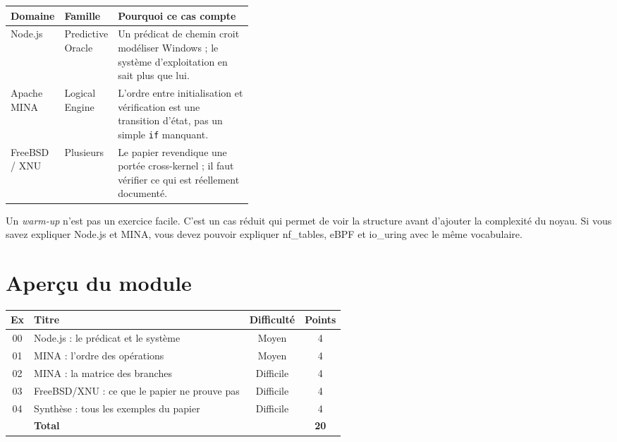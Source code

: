 \documentclass{training}
\begin{document}
\begin{center}
\begin{tabularx}{\linewidth}{|p{0.2\linewidth}|p{0.2\linewidth}|X|}
\hline
\textbf{Domaine} & \textbf{Famille} & \textbf{Pourquoi ce cas compte} \\ \hline
Node.js & Predictive Oracle & Un prédicat de chemin croit modéliser Windows ;
le système d'exploitation en sait plus que lui. \\ \hline
Apache MINA & Logical Engine & L'ordre entre initialisation et vérification
est une transition d'état, pas un simple \texttt{if} manquant. \\ \hline
FreeBSD / XNU & Plusieurs & Le papier revendique une portée cross-kernel ;
il faut vérifier ce qui est réellement documenté. \\ \hline
\end{tabularx}
\end{center}

\begin{info}
Un \emph{warm-up} n'est pas un exercice facile. C'est un cas réduit qui
permet de voir la structure avant d'ajouter la complexité du noyau. Si vous
savez expliquer Node.js et MINA, vous devez pouvoir expliquer nf\_tables,
eBPF et io\_uring avec le même vocabulaire.
\end{info}

\chapter{Aperçu du module}

\begin{center}
\begin{tabularx}{\linewidth}{|c|l|c|c|}
\hline
\textbf{Ex} & \textbf{Titre} & \textbf{Difficulté} & \textbf{Points} \\ \hline
00 & Node.js : le prédicat et le système & Moyen & 4 \\
01 & MINA : l'ordre des opérations & Moyen & 4 \\
02 & MINA : la matrice des branches & Difficile & 4 \\
03 & FreeBSD/XNU : ce que le papier ne prouve pas & Difficile & 4 \\
04 & Synthèse : tous les exemples du papier & Difficile & 4 \\ \hline
& \textbf{Total} & & \textbf{20} \\ \hline
\end{tabularx}
\end{center}
\end{document}
